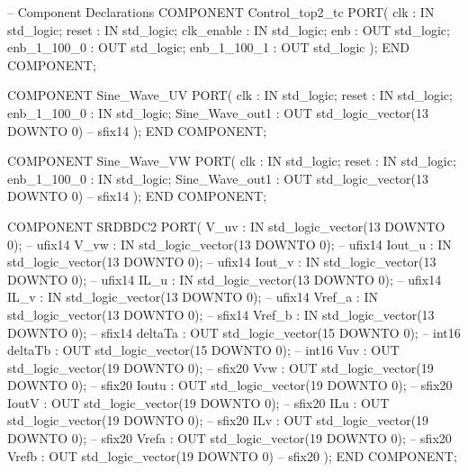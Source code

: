 \begin{mylisting}[language=VHDL,caption=MSSRDCDB制御\&SVPWMモジュール,label=appF_Control_top2_module_VHDL]
  -- Component Declarations
  COMPONENT Control_top2_tc
    PORT( clk                             :   IN    std_logic;
          reset                           :   IN    std_logic;
          clk_enable                      :   IN    std_logic;
          enb                             :   OUT   std_logic;
          enb_1_100_0                     :   OUT   std_logic;
          enb_1_100_1                     :   OUT   std_logic
          );
  END COMPONENT;

  COMPONENT Sine_Wave_UV
    PORT( clk                             :   IN    std_logic;
          reset                           :   IN    std_logic;
          enb_1_100_0                     :   IN    std_logic;
          Sine_Wave_out1                  :   OUT   std_logic_vector(13 DOWNTO 0)  -- sfix14
          );
  END COMPONENT;

  COMPONENT Sine_Wave_VW
    PORT( clk                             :   IN    std_logic;
          reset                           :   IN    std_logic;
          enb_1_100_0                     :   IN    std_logic;
          Sine_Wave_out1                  :   OUT   std_logic_vector(13 DOWNTO 0)  -- sfix14
          );
  END COMPONENT;

  COMPONENT SRDBDC2
    PORT( V_uv                            :   IN    std_logic_vector(13 DOWNTO 0);  -- ufix14
          V_vw                            :   IN    std_logic_vector(13 DOWNTO 0);  -- ufix14
          Iout_u                          :   IN    std_logic_vector(13 DOWNTO 0);  -- ufix14
          Iout_v                          :   IN    std_logic_vector(13 DOWNTO 0);  -- ufix14
          IL_u                            :   IN    std_logic_vector(13 DOWNTO 0);  -- ufix14
          IL_v                            :   IN    std_logic_vector(13 DOWNTO 0);  -- ufix14
          Vref_a                          :   IN    std_logic_vector(13 DOWNTO 0);  -- sfix14
          Vref_b                          :   IN    std_logic_vector(13 DOWNTO 0);  -- sfix14
          deltaTa                         :   OUT   std_logic_vector(15 DOWNTO 0);  -- int16
          deltaTb                         :   OUT   std_logic_vector(15 DOWNTO 0);  -- int16
          Vuv                             :   OUT   std_logic_vector(19 DOWNTO 0);  -- sfix20
          Vvw                             :   OUT   std_logic_vector(19 DOWNTO 0);  -- sfix20
          Ioutu                           :   OUT   std_logic_vector(19 DOWNTO 0);  -- sfix20
          IoutV                           :   OUT   std_logic_vector(19 DOWNTO 0);  -- sfix20
          ILu                             :   OUT   std_logic_vector(19 DOWNTO 0);  -- sfix20
          ILv                             :   OUT   std_logic_vector(19 DOWNTO 0);  -- sfix20
          Vrefa                           :   OUT   std_logic_vector(19 DOWNTO 0);  -- sfix20
          Vrefb                           :   OUT   std_logic_vector(19 DOWNTO 0)  -- sfix20
          );
  END COMPONENT;


\end{mylisting}
